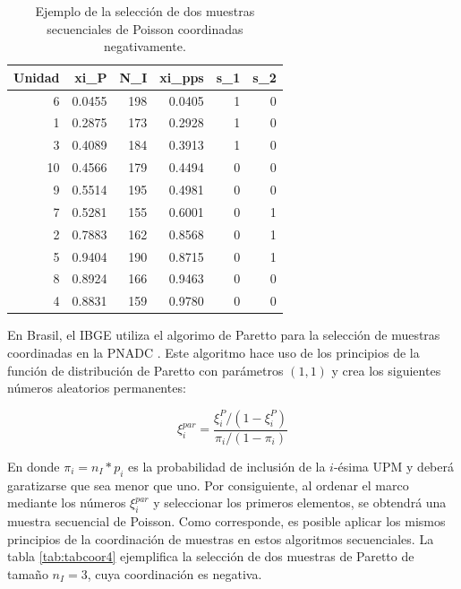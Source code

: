 \documentclass[
  12pt,
]{book}
\begin{document}
\begin{table}

\caption{\label{tab:tabcoor3}Ejemplo de la selección de dos muestras secuenciales de Poisson coordinadas negativamente.}
\centering
\begin{tabular}[t]{r|r|r|r|r|r}
\hline
Unidad & xi\_P & N\_I & xi\_pps & s\_1 & s\_2\\
\hline
6 & 0.0455 & 198 & 0.0405 & 1 & 0\\
\hline
1 & 0.2875 & 173 & 0.2928 & 1 & 0\\
\hline
3 & 0.4089 & 184 & 0.3913 & 1 & 0\\
\hline
10 & 0.4566 & 179 & 0.4494 & 0 & 0\\
\hline
9 & 0.5514 & 195 & 0.4981 & 0 & 0\\
\hline
7 & 0.5281 & 155 & 0.6001 & 0 & 1\\
\hline
2 & 0.7883 & 162 & 0.8568 & 0 & 1\\
\hline
5 & 0.9404 & 190 & 0.8715 & 0 & 1\\
\hline
8 & 0.8924 & 166 & 0.9463 & 0 & 0\\
\hline
4 & 0.8831 & 159 & 0.9780 & 0 & 0\\
\hline
\end{tabular}
\end{table}

En Brasil, el IBGE utiliza el algorimo de Paretto \citep{Rosen_1997} para la selección de muestras coordinadas en la PNADC \citep{Costa_2007}. Este algoritmo hace uso de los principios de la función de distribución de Paretto con parámetros \((1,1)\) y crea los siguientes números aleatorios permanentes:

\[
\xi_i^{par} = \frac{\xi_i^P/(1-\xi_i^P)}{\pi_i/(1-\pi_i)}
\]

En donde \(\pi_i = n_I * p_i\) es la probabilidad de inclusión de la \(i\)-ésima UPM y deberá garatizarse que sea menor que uno. Por consiguiente, al ordenar el marco mediante los números \(\xi_i^{par}\) y seleccionar los primeros elementos, se obtendrá una muestra secuencial de Poisson. Como corresponde, es posible aplicar los mismos principios de la coordinación de muestras en estos algoritmos secuenciales. La tabla \ref{tab:tabcoor4} ejemplifica la selección de dos muestras de Paretto de tamaño \(n_I = 3\), cuya coordinación es negativa.
\end{document}
